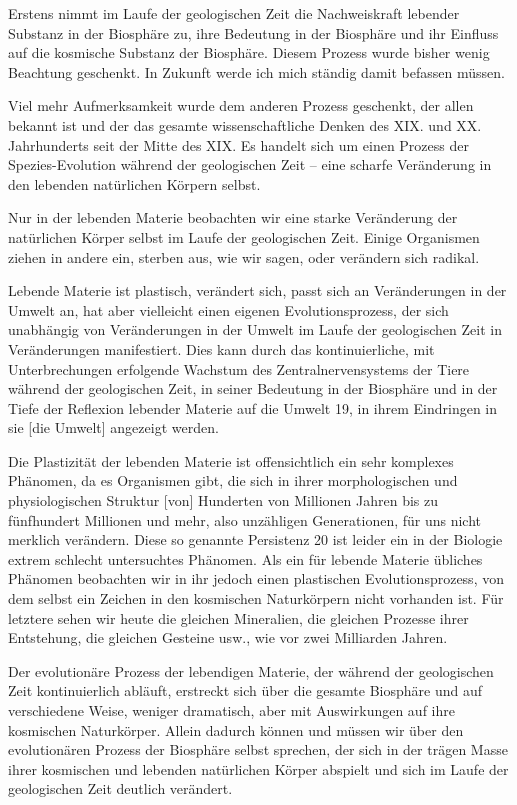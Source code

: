 \documentclass[11pt,a4paper]{book}
\begin{document}
Erstens nimmt im Laufe der geologischen Zeit die Nachweiskraft lebender
Substanz in der Biosphäre zu, ihre Bedeutung in der Biosphäre und ihr Einfluss
auf die kosmische Substanz der Biosphäre. Diesem Prozess wurde bisher wenig
Beachtung geschenkt. In Zukunft werde ich mich ständig damit befassen müssen.

Viel mehr Aufmerksamkeit wurde dem anderen Prozess geschenkt, der allen
bekannt ist und der das gesamte wissenschaftliche Denken des XIX. und
XX. Jahrhunderts seit der Mitte des XIX. Es handelt sich um einen Prozess der
Spezies-Evolution während der geologischen Zeit -- eine scharfe Veränderung in
den lebenden natürlichen Körpern selbst.

Nur in der lebenden Materie beobachten wir eine starke Veränderung der
natürlichen Körper selbst im Laufe der geologischen Zeit. Einige Organismen
ziehen in andere ein, sterben aus, wie wir sagen, oder verändern sich radikal.

Lebende Materie ist plastisch, verändert sich, passt sich an Veränderungen in
der Umwelt an, hat aber vielleicht einen eigenen Evolutionsprozess, der sich
unabhängig von Veränderungen in der Umwelt im Laufe der geologischen Zeit in
Veränderungen manifestiert. Dies kann durch das kontinuierliche, mit
Unterbrechungen erfolgende Wachstum des Zentralnervensystems der Tiere während
der geologischen Zeit, in seiner Bedeutung in der Biosphäre und in der Tiefe
der Reflexion lebender Materie auf die Umwelt 19, in ihrem Eindringen in sie
[die Umwelt] angezeigt werden.

Die Plastizität der lebenden Materie ist offensichtlich ein sehr komplexes
Phänomen, da es Organismen gibt, die sich in ihrer morphologischen und
physiologischen Struktur [von] Hunderten von Millionen Jahren bis zu
fünfhundert Millionen und mehr, also unzähligen Generationen, für uns nicht
merklich verändern. Diese so genannte Persistenz 20 ist leider ein in der
Biologie extrem schlecht untersuchtes Phänomen. Als ein für lebende Materie
übliches Phänomen beobachten wir in ihr jedoch einen plastischen
Evolutionsprozess, von dem selbst ein Zeichen in den kosmischen Naturkörpern
nicht vorhanden ist. Für letztere sehen wir heute die gleichen Mineralien, die
gleichen Prozesse ihrer Entstehung, die gleichen Gesteine usw., wie vor zwei
Milliarden Jahren.

Der evolutionäre Prozess der lebendigen Materie, der während der geologischen
Zeit kontinuierlich abläuft, erstreckt sich über die gesamte Biosphäre und auf
verschiedene Weise, weniger dramatisch, aber mit Auswirkungen auf ihre
kosmischen Naturkörper. Allein dadurch können und müssen wir über den
evolutionären Prozess der Biosphäre selbst sprechen, der sich in der trägen
Masse ihrer kosmischen und lebenden natürlichen Körper abspielt und sich im
Laufe der geologischen Zeit deutlich verändert.
\end{document}
